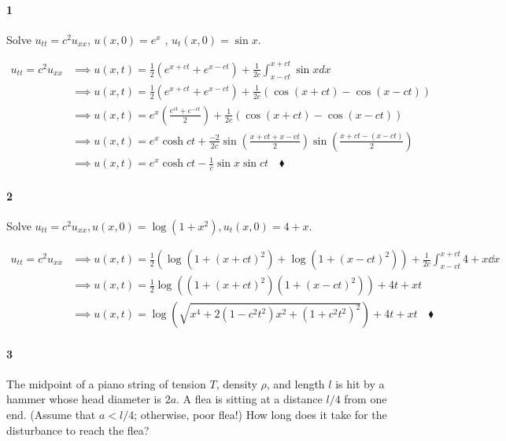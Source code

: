 \documentclass{article}
\begin{document}
\paragraph{1} Solve $u_{tt} = c^2 u_{ x x}$, $u(x, 0) = e^x$ , $u_t
(x, 0) = \sin x$.

\begin{align*}
  u_{tt} = c^2 u_{ x x}
  &\implies u(x,t) = \frac{1}{2}\left(e^{x+ct}+e^{x-ct}\right) +\frac{1}{2c}
                          \int_{x-ct}^{x+ct}\sin x dx\\
  &\implies u(x,t) = \frac{1}{2}\left(e^{x+ct}+e^{x-ct}\right)+
    \frac{1}{2c}\left(  \cos(x+ct)-\cos(x-ct)\right)\\
  &\implies u(x,t) = e^x\left(\frac{e^{ct}+e^{-ct}}{2}\right) +
    \frac{1}{2c}\left(\cos(x+ct)-\cos(x-ct)\right)\\
  &\implies u(x,t) = e^x\cosh ct + \frac{-2}{2c}\sin\left(
    \frac{x+ct+x-ct}{2} \right)\sin\left( \frac{x+ct-(x-ct)}{2}
    \right)\\
    &\implies u(x,t) = e^x\cosh ct -\frac{1}{c}\sin x \sin ct \quad \blacklozenge
\end{align*}

\paragraph{2} Solve $u_{tt} = c^2 u_{x x} , u(x, 0) = \log(1 + x^2),
u_t (x, 0) = 4 + x$.


\begin{align*}
  u_{tt} = c^2 u_{ x x}
  &\implies u(x,t) = \frac{1}{2}\left( \log (1+(x+ct)^2)
    +\log(1+(x-ct)^2)\right)
    +\frac{1}{2c}
      \int_{x-ct}^{x+ct} 4+x \dd{x}\\
       &\implies u(x,t) = \frac{1}{2}\log ((1+ (x+ct)^2)(1 +(x-ct)^2))
       +4t+xt\\
    &\implies u(x,t) = \log (\sqrt{x^4+2(1-c^2t^2)x^2+(1 + c^2t^2)^2})     +4t+xt \quad \blacklozenge
\end{align*}

\newpage
\paragraph{3} The midpoint of a piano string of tension $T$, density $ρ$, and length $l$ is hit
by a hammer whose head diameter is $2a$. A flea is sitting at a distance
$l/4$ from one end. (Assume that $a < l/4$; otherwise, poor flea!) How long
does it take for the disturbance to reach the flea?
\end{document}
